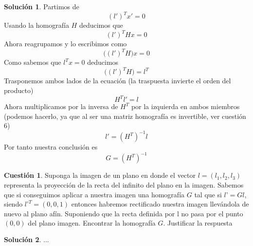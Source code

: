 \documentclass[a4paper, 11pt]{article}
\theoremstyle{definition}
\newtheorem{cuestion}{Cuestión}
\newtheorem*{solucion}{Solución}
\begin{document}
  \begin{solucion}
      Partimos de
      $$(l')^T x' = 0$$
      Usando la homografía $H$ deducimos que
      $$(l')^T Hx = 0$$
      Ahora reagrupamos y lo escribimos como
      $$\big((l')^T H\big)x = 0$$
      Como sabemos que $l^T x = 0$  deducimos
      $$\big((l')^T H\big) = l^T$$
      Trasponemos ambos lados de la ecuación (la traspuesta invierte el orden del producto)
      $$H^T l' = l$$
      Ahora multiplicamos por la inversa de $H^T$ por la izquierda en ambos miembros
      (podemos hacerlo, ya que al ser una matriz homografía es invertible, ver cuestión
      6)
      $$l' = (H^T)^{-1} l$$
      Por tanto nuestra conclusión es
      $$G = (H^T)^{-1}$$
  \end{solucion}

  \begin{cuestion}
    Suponga la imagen de un plano en donde el vector $l=(l_1,l_2,l_3)$ representa
    la proyección de la recta del infinito del plano en la imagen. Sabemos que si
    conseguimos aplicar a nuestra imagen una homografía $G$ tal que si $l’= Gl$, siendo
    $l’^T =(0,0,1)$ entonces habremos rectificado nuestra imagen llevándola de nuevo
    al plano afín. Suponiendo que la recta definida por l no pasa por el punto $(0,0)$
    del plano imagen. Encontrar la homografía $G$. Justificar la respuesta

  \end{cuestion}

  \begin{solucion}
    ...
  \end{solucion}
\end{document}
